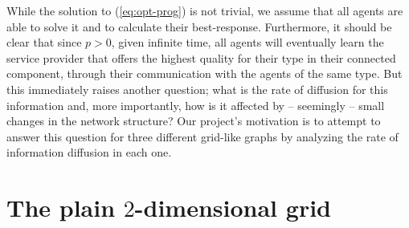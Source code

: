 \documentclass[A4paper,11pt]{article}
\begin{document}
\par While the solution to (\ref{eq:opt-prog}) is not trivial, we assume that all agents are able to solve it and to calculate
their best-response. Furthermore, it should be clear that since $p > 0$, given infinite time, all agents will eventually learn
the service provider that offers the highest quality for their type in their connected component, through their communication with
the agents of the same type. But this immediately raises another question; what is the rate of diffusion for this information and,
more importantly, how is it affected by -- seemingly -- small changes in the network structure? Our project's motivation is to
attempt to answer this question for three different grid-like graphs by analyzing the rate of information diffusion in each one.

\section{The plain $2$-dimensional grid}





%

\end{document}
